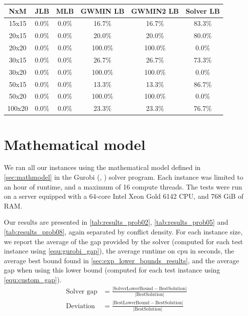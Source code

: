 \documentclass{mimosis}
\begin{document}
\begin{table}[h]
\centering
\begin{tabular}{c|ccccc}
NxM & JLB & MLB & GWMIN LB & GWMIN2 LB & Solver LB \\
\hline
15x15 & 0.0\% & 0.0\% & 16.7\% & 16.7\% & 83.3\% \\
20x15 & 0.0\% & 0.0\% & 20.0\% & 20.0\% & 80.0\% \\
20x20 & 0.0\% & 0.0\% & 100.0\% & 100.0\% & 0.0\% \\
30x15 & 0.0\% & 0.0\% & 26.7\% & 26.7\% & 73.3\% \\
30x20 & 0.0\% & 0.0\% & 100.0\% & 100.0\% & 0.0\% \\
50x15 & 0.0\% & 0.0\% & 13.3\% & 13.3\% & 86.7\% \\
50x20 & 0.0\% & 0.0\% & 100.0\% & 100.0\% & 0.0\% \\
100x20 & 0.0\% & 0.0\% & 23.3\% & 23.3\% & 76.7\% \\
\end{tabular}
\label{tab:lbprob08}
\end{table}

\FloatBarrier

\section{Mathematical model} \label{sect:mathmodel}

We ran all our instances using the mathematical model defined in \cref{sec:mathmodel} in the Gurobi (\citeauthor{gurobi2024}, \citeyear{gurobi2024}) solver program. Each instance was limited to an hour of runtime, and a maximum of 16 compute threads. The tests were run on a server equipped with a \(64\)-core Intel Xeon Gold 6142 CPU, and 768 GiB of RAM.

Our results are presented in \cref{tab:results_prob02}, \cref{tab:results_prob05} and \cref{tab:results_prob08}, again separated by conflict density. For each instance size, we report the average of the gap provided by the solver (computed for each test instance using \cref{equ:gurobi_gap}), the average runtime on cpu in seconds, the average best bound found in \cref{sec:exp_lower_bounds_results}, and the average gap when using this lower bound (computed for each test instance using \cref{equ:custom_gap}).
\begin{align}
\text{Solver gap} &= \frac{\lvert\text{SolverLowerBound} - \text{BestSolution}\rvert}{\lvert\text{BestSolution}\rvert} 
\label{equ:gurobi_gap} \\
\text{Deviation} &= \frac{\lvert\text{BestLowerBound} - \text{BestSolution}\rvert}{\lvert\text{BestSolution}\rvert} 
\label{equ:custom_gap}
\end{align} 
\end{document}
